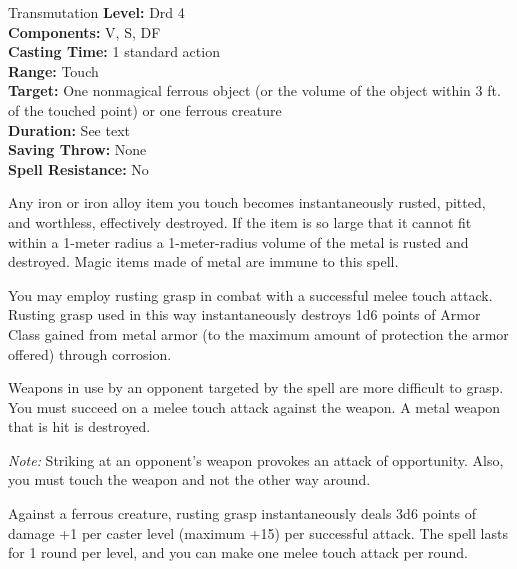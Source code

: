 {Transmutation}
{
	\textbf{Level:}
	Drd 4\\
	\textbf{Components:}
	V, S, DF\\
	\textbf{Casting Time:}
	1 standard action\\
	\textbf{Range:}
	Touch\\
	\textbf{Target:}
	One nonmagical ferrous object (or the volume of the object within 3 ft. of the touched point) or one ferrous creature\\
	\textbf{Duration:}
	See text\\
	\textbf{Saving Throw:}
	None\\
	\textbf{Spell Resistance:}
	No\\
}
{
	Any iron or iron alloy item you touch becomes instantaneously rusted, pitted, and worthless, effectively destroyed. If the item is so large that it cannot fit within a 1-meter radius a 1-meter-radius volume of the metal is rusted and destroyed. Magic items made of metal are immune to this spell.

	You may employ rusting grasp in combat with a successful melee touch attack. Rusting grasp used in this way instantaneously destroys 1d6 points of Armor Class gained from metal armor (to the maximum amount of protection the armor offered) through corrosion.

	Weapons in use by an opponent targeted by the spell are more difficult to grasp. You must succeed on a melee touch attack against the weapon. A metal weapon that is hit is destroyed.

	\textit{Note:} Striking at an opponent's weapon provokes an attack of opportunity. Also, you must touch the weapon and not the other way around.

	Against a ferrous creature, rusting grasp instantaneously deals 3d6 points of damage +1 per caster level (maximum +15) per successful attack. The spell lasts for 1 round per level, and you can make one melee touch attack per round.

}
